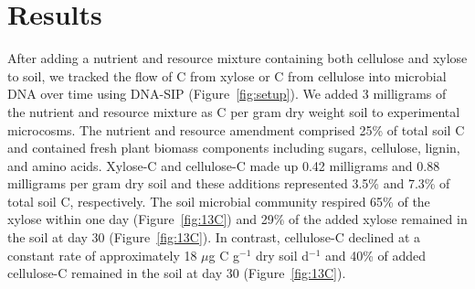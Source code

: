 \section{Results}
After adding a nutrient and resource mixture containing
both cellulose and xylose to soil, we tracked the flow of C from xylose or
C from cellulose into microbial DNA over time using DNA-SIP
(Figure~\ref{fig:setup}). We added 3 milligrams of the nutrient and resource
mixture as C per gram dry weight soil to experimental microcosms. The nutrient
and resource amendment comprised 25\% of total soil C and contained fresh plant
biomass components including sugars, cellulose, lignin, and amino acids.
Xylose-C and cellulose-C made up 0.42 milligrams and 0.88 milligrams per gram
dry soil and these additions represented 3.5\% and 7.3\% of total soil C,
respectively. The soil microbial community respired 65\% of the xylose within
one day (Figure~\ref{fig:13C}) and 29\% of the added xylose remained in the
soil at day 30 (Figure~\ref{fig:13C}). In contrast, cellulose-C declined at
a constant rate of approximately 18 $\mu$g C g$^{-1}$ dry soil d$^{-1}$ and
40\% of added cellulose-C remained in the soil at day 30
(Figure~\ref{fig:13C}). 

